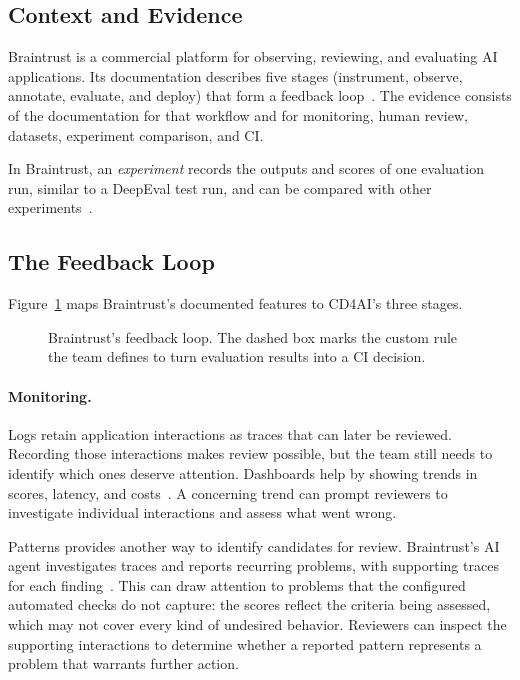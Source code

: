 \subsection{Context and Evidence}

Braintrust is a commercial platform for observing, reviewing, and evaluating AI
applications. Its documentation describes five stages (instrument, observe,
annotate, evaluate, and deploy) that form a feedback
loop~\parencite{Braintrust:Workflow}. The evidence consists of the documentation
for that workflow and for monitoring, human review, datasets, experiment
comparison, and CI.

In Braintrust, an \emph{experiment} records the outputs and scores of one evaluation run, similar
to a DeepEval test run, and can be compared with other
experiments~\parencite{Braintrust:DatasetUse,Braintrust:Comparison}.

\subsection{The Feedback Loop}

Figure~\ref{fig:case-braintrust} maps Braintrust's documented features to
CD4AI's three stages.

\begin{figure}[H]
  \centering
  
  \caption{Braintrust's feedback loop. The dashed box marks the custom rule
    the team defines to turn evaluation results into a CI decision.}
  \label{fig:case-braintrust}
\end{figure}

\paragraph{Monitoring.}
Logs retain application interactions as traces that can later be reviewed.
Recording those interactions makes review possible, but the team still needs
to identify which ones deserve attention. Dashboards help by showing trends
in scores, latency, and costs~\parencite{Braintrust:Dashboards}. A concerning
trend can prompt reviewers to investigate individual interactions and assess
what went wrong.

Patterns provides another way to identify candidates for review. Braintrust's
AI agent investigates traces and reports recurring problems, with supporting
traces for each finding~\parencite{Braintrust:Patterns}. This can draw
attention to problems that the configured automated checks do not capture: the scores
reflect the criteria being assessed, which may not cover every kind of
undesired behavior. Reviewers can inspect the supporting interactions to
determine whether a reported pattern represents a problem that warrants
further action.

